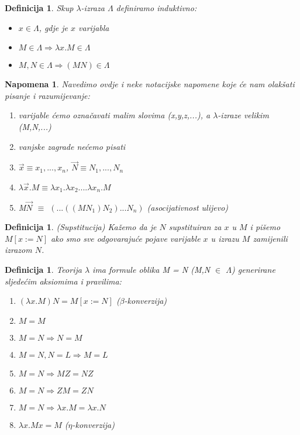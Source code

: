 \documentclass[a4paper,12pt]{article}
\newtheorem{defn}[thm]{Definicija}
\newtheorem{rem}[thm]{Napomena}
\begin{document}
\begin{defn} Skup $\lambda$-izraza $\Lambda$ definiramo induktivno:
\begin{itemize}
	\item $x \in \Lambda$, gdje je $x$ varijabla
	\item $M \in \Lambda \Rightarrow \lambda x.M \in \Lambda$
	\item $M,N \in \Lambda \Rightarrow (MN) \in \Lambda$
\end{itemize}
\end{defn}

\begin{rem} Navedimo ovdje i neke notacijske napomene koje će nam olakšati pisanje i razumijevanje:
\begin{enumerate}
	\item varijable ćemo označavati malim slovima (x,y,z,...), a $\lambda$-izraze velikim (M,N,...)
	\item vanjske zagrade nećemo pisati
	\item $\overrightarrow{x} \equiv x_1, ..., x_n$, $\overrightarrow{N} \equiv N_1, ..., N_n$
	\item $\lambda \overrightarrow{x}.M \equiv \lambda x_1. \lambda x_2. ... \lambda x_n. M$
	\item M$\overrightarrow{N}$ $\equiv$ $(... ((MN_1) N_2) ...N_n)$ (asocijativnost ulijevo)
\end{enumerate}
\end{rem}

\begin{defn} (Supstitucija) Kažemo da je $N$ supstituiran za $x$ u $M$ i pišemo $M[x:=N]$ ako smo sve odgovarajuće pojave varijable $x$ u izrazu $M$ zamijenili izrazom $N$.
\end{defn}

\begin{defn} Teorija $\lambda$ ima formule oblika M = N (M,N $\in$ $\Lambda$) generirane sljedećim aksiomima i pravilima:
\begin{enumerate}
	\item $(\lambda x.M)N = M[x:=N]$ ($\beta$-konverzija)
	\item $M = M$
	\item $M = N \Rightarrow N = M$
	\item $M = N, N = L \Rightarrow M = L$
	\item $M = N \Rightarrow MZ = NZ$
	\item $M = N \Rightarrow ZM = ZN$
	\item $M = N \Rightarrow \lambda x.M = \lambda x.N$
	\item $\lambda x. M x = M$ ($\eta$-konverzija)
\end{enumerate}
\end{defn}
\end{document}

